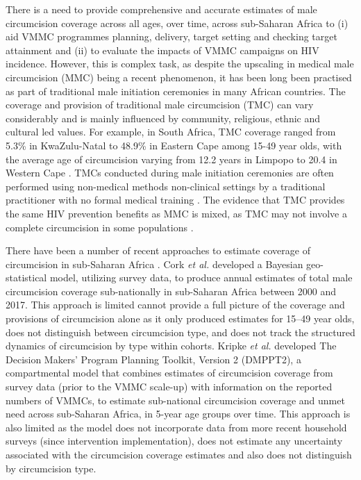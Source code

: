 \documentclass{article}
\begin{document}
There is a need to provide comprehensive and accurate estimates of male circumcision coverage across all ages, over time, across sub-Saharan Africa to (i) aid VMMC programmes planning, delivery, target setting and checking target attainment and (ii) to evaluate the impacts of VMMC campaigns on HIV incidence. However, this is complex task, as despite the upscaling in medical male circumcision (MMC) being a recent phenomenon, it has been long been practised as part of traditional male initiation ceremonies in many African countries. The coverage and provision of traditional male circumcision (TMC) can vary considerably and is mainly influenced by community, religious, ethnic and cultural led values. For example, in South Africa, TMC coverage ranged from 5.3\% in KwaZulu-Natal to 48.9\% in Eastern Cape among 15-49 year olds, with the average age of circumcision varying from 12.2 years in Limpopo to 20.4 in Western Cape \cite{thomas2024substantial}. TMCs conducted during male initiation ceremonies are often performed using non-medical methods non-clinical settings by a traditional practitioner with no formal medical training \cite{drain2006male, wilcken2010traditional, weiss2000male}. The evidence that TMC provides the same HIV prevention benefits as MMC is mixed, as TMC may not involve a complete circumcision in some populations \cite{WHOTraditional, shaffer2007protective, bailey2008male}.  

There have been a number of recent approaches to estimate coverage of circumcision in sub-Saharan Africa \cite{cork2020mapping, kripke2016age, kripke2016cost, thomas2024substantial}. Cork {\it et al.} \cite{cork2020mapping} developed a Bayesian geo-statistical model, utilizing survey data, to produce annual estimates of total male circumcision coverage sub-nationally in sub-Saharan Africa between 2000 and 2017. This approach is limited cannot provide a full picture of the coverage and provisions of circumcision alone as it only produced estimates for 15–49 year olds, does not distinguish between circumcision type, and does not track the structured dynamics of circumcision by type within cohorts. Kripke {\it et al.} \cite{kripke2016age, kripke2016cost} developed The Decision Makers’ Program Planning Toolkit, Version 2 (DMPPT2), a compartmental model that combines estimates of circumcision coverage from survey data (prior to the VMMC scale-up) with information on the reported numbers of VMMCs, to estimate sub-national circumcision coverage and unmet need across sub-Saharan Africa, in 5-year age groups over time. This approach is also limited as the model does not incorporate data from more recent household surveys (since intervention implementation), does not estimate any uncertainty associated with the circumcision coverage estimates and also does not distinguish by circumcision type. 
\end{document}
